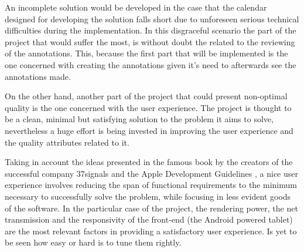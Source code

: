 An incomplete solution would be developed in the case that the calendar designed for developing the solution falls short due to unforeseen serious technical difficulties during the implementation. In this disgraceful scenario the part of the project that would suffer the most, is without doubt the related to the reviewing of the annotations. This, because the first part that will be implemented is the one concerned with creating the annotations given it's need to afterwards see the annotations made.

On the other hand, another part of the project that could present non-optimal quality is the one concerned with the user experience. The project is thought to be a clean, minimal but satisfying solution to the problem it aims to solve, nevertheless a huge effort is being invested in improving the user experience and the quality attributes related to it. 

Taking in account the ideas presented in the famous book by the creators of the successful company 37signals \cite{37signals} and the Apple Development Guidelines \cite{apple}, a nice user experience involves reducing the span of functional requirements to the minimum necessary to successfully solve the problem, while focusing in less evident goods of the software. In the particular case of the project, the rendering power, the net transmission and the responsivity of the front-end (the Android powered tablet) are the most relevant factors in providing a satisfactory user experience. Is yet to be seen how easy or hard is to tune them rightly.